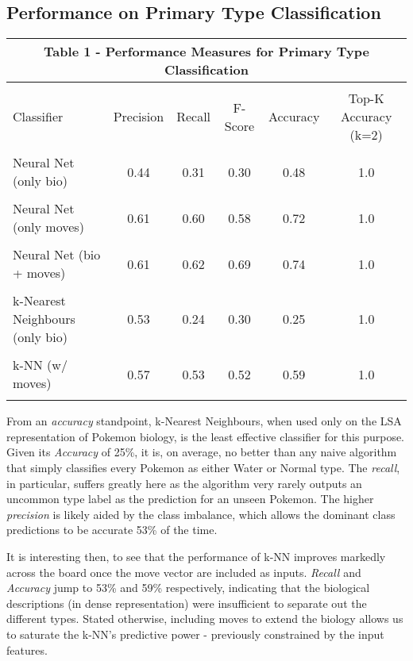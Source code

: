 \documentclass{winnower}
\begin{document}
\subsection{Performance on Primary Type Classification}

\begin{center}
\begin{tabular}{lccccc} \multicolumn{6}{c}{Table 1 - Performance Measures for Primary Type Classification} \\ \hline
& & & & &  \\
Classifier & Precision & Recall & F-Score & Accuracy & Top-K Accuracy (k=2) \\ \hline
& & & & &  \\
Neural Net (only bio) & 0.44 & 0.31 & 0.30 & 0.48 & 1.0 \\
& & & & &  \\
Neural Net (only moves) & 0.61 & 0.60 & 0.58 & 0.72 & 1.0 \\
& & & & &  \\
Neural Net (bio + moves) & 0.61 & 0.62 & 0.69 & 0.74 & 1.0 \\
& & & & &  \\
k-Nearest Neighbours (only bio) & 0.53 & 0.24 & 0.30 & 0.25 & 1.0 \\
& & & & &  \\
k-NN (w/ moves) & 0.57 & 0.53 & 0.52 & 0.59 & 1.0 \\
& & & & &  \\ \hline
\end{tabular}
\end{center}

From an \textit{accuracy} standpoint, k-Nearest Neighbours, when used only on the LSA representation of Pokemon biology, is the least effective classifier for this purpose. Given its \textit{Accuracy} of 25\%, it is, on average, no better than any naive algorithm that simply classifies every Pokemon as either Water or Normal type. The \textit{recall}, in particular, suffers greatly here as the algorithm very rarely outputs an uncommon type label as the prediction for an unseen Pokemon. The higher \textit{precision} is likely aided by the class imbalance, which allows the dominant class predictions to be accurate 53\% of the time. 

It is interesting then, to see that the performance of k-NN improves markedly across the board once the move vector are included as inputs. \textit{Recall} and \textit{Accuracy} jump to 53\% and 59\% respectively, indicating that the biological descriptions (in dense representation) were insufficient to separate out the different types. Stated otherwise, including moves to extend the biology allows us to saturate the k-NN's predictive power -  previously constrained by the input features. 
\end{document}
